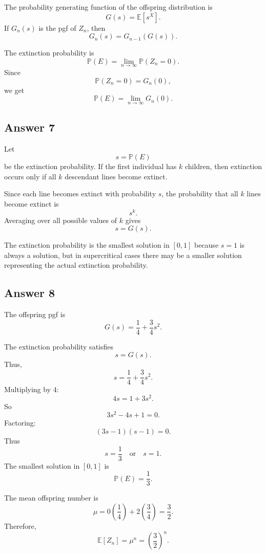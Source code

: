 \documentclass[12pt,a4paper]{article}
\theoremstyle{lecturestyle}
\newcommand{\Prob}{\mathbb{P}}
\newcommand{\E}{\mathbb{E}}
\begin{document}
The probability generating function of the offspring distribution is
\[
G(s)=\E[s^X].
\]
If $G_n(s)$ is the pgf of $Z_n$, then
\[
G_n(s)=G_{n-1}(G(s)).
\]

The extinction probability is
\[
\Prob(E)=\lim_{n\to\infty}\Prob(Z_n=0).
\]
Since
\[
\Prob(Z_n=0)=G_n(0),
\]
we get
\[
\Prob(E)=\lim_{n\to\infty}G_n(0).
\]

\subsection*{Answer 7}

Let
\[
s=\Prob(E)
\]
be the extinction probability. If the first individual has $k$ children, then extinction occurs only if all $k$ descendant lines become extinct.

Since each line becomes extinct with probability $s$, the probability that all $k$ lines become extinct is
\[
s^k.
\]
Averaging over all possible values of $k$ gives
\[
s=G(s).
\]

The extinction probability is the smallest solution in $[0,1]$ because $s=1$ is always a solution, but in supercritical cases there may be a smaller solution representing the actual extinction probability.

\subsection*{Answer 8}

The offspring pgf is
\[
G(s)=\frac14+\frac34s^2.
\]

The extinction probability satisfies
\[
s=G(s).
\]
Thus,
\[
s=\frac14+\frac34s^2.
\]
Multiplying by 4:
\[
4s=1+3s^2.
\]
So
\[
3s^2-4s+1=0.
\]
Factoring:
\[
(3s-1)(s-1)=0.
\]
Thus
\[
s=\frac13
\quad\text{or}\quad
s=1.
\]
The smallest solution in $[0,1]$ is
\[
\Prob(E)=\frac13.
\]

The mean offspring number is
\[
\mu=0\left(\frac14\right)+2\left(\frac34\right)=\frac32.
\]
Therefore,
\[
\E[Z_n]=\mu^n=\left(\frac32\right)^n.
\]
\end{document}
